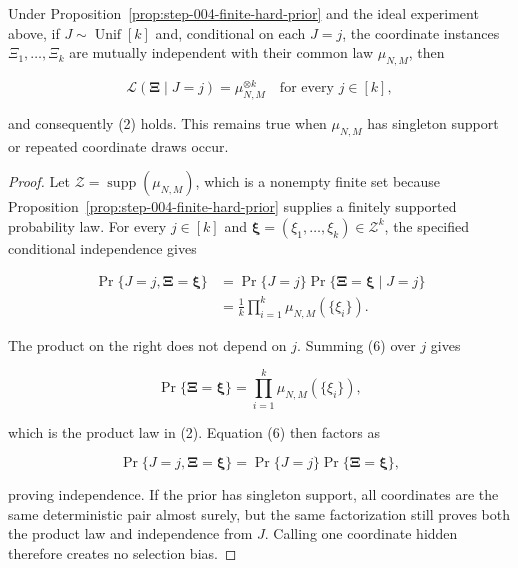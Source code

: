 \begin{lemma}\label{lem:step-008-instance-factorization}
Under Proposition~\ref{prop:step-004-finite-hard-prior} and the
ideal experiment above, if \(J\sim\operatorname{Unif}[k]\) and, conditional
on each \(J=j\), the coordinate instances
\(\Xi_1,\ldots,\Xi_k\) are mutually independent with their common law
\(\mu_{N,M}\), then

\[
\mathcal L(\boldsymbol\Xi\mid J=j)=\mu_{N,M}^{\otimes k}
\quad\text{for every }j\in[k],
\tag{5}
\]

and consequently (2) holds. This remains true when \(\mu_{N,M}\) has
singleton support or repeated coordinate draws occur.
\end{lemma}

\begin{proof}
Let \(\mathcal Z=\operatorname{supp}(\mu_{N,M})\), which is a nonempty
finite set because Proposition~\ref{prop:step-004-finite-hard-prior}
supplies a finitely supported
probability law. For every \(j\in[k]\) and
\(\boldsymbol\xi=(\xi_1,\ldots,\xi_k)\in\mathcal Z^k\), the specified
conditional independence gives

\[
\begin{aligned}
\Pr\{J=j,\boldsymbol\Xi=\boldsymbol\xi\}
&=\Pr\{J=j\}
  \Pr\{\boldsymbol\Xi=\boldsymbol\xi\mid J=j\}\\
&=\frac1k\prod_{i=1}^k\mu_{N,M}(\{\xi_i\}).
\end{aligned}
\tag{6}
\]

The product on the right does not depend on \(j\). Summing (6) over
\(j\) gives

\[
\Pr\{\boldsymbol\Xi=\boldsymbol\xi\}
=\prod_{i=1}^k\mu_{N,M}(\{\xi_i\}),
\]

which is the product law in (2). Equation (6) then factors as

\[
\Pr\{J=j,\boldsymbol\Xi=\boldsymbol\xi\}
=\Pr\{J=j\}\Pr\{\boldsymbol\Xi=\boldsymbol\xi\},
\]

proving independence. If the prior has singleton support, all coordinates
are the same deterministic pair almost surely, but the same factorization
still proves both the product law and independence from \(J\). Calling one
coordinate hidden therefore creates no selection bias. \end{proof}

